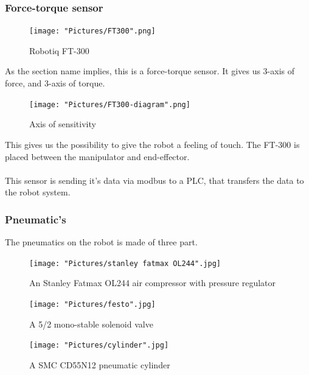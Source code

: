 \documentclass{article}
\begin{document}
  \newpage
  
        \subsubsection{Force-torque sensor}
        \begin{figure}[!h]
            \centering
            \texttt{[image: "Pictures/FT300".png]}
            \caption{Robotiq FT-300}
        \end{figure}
        
        As the section name implies, this is a force-torque sensor. It gives us 3-axis of force, and 3-axis of torque. 
        
          \begin{figure}[!h]
            \centering
            \texttt{[image: "Pictures/FT300-diagram".png]}
            \caption{Axis of sensitivity}
        \end{figure}
        This gives us the possibility to give the robot a feeling of touch. The FT-300 is placed between the manipulator and end-effector.
        \\\\
        This sensor is sending it's data via modbus to a PLC, that transfers the data to the robot system.
       
\newpage
        
        \subsubsection{Pneumatic's}
        The pneumatics on the robot is made of three part. 
        \begin{figure}[!h]
            \centering
            \texttt{[image: "Pictures/stanley fatmax OL244".jpg]}
            \caption{An Stanley Fatmax OL244 air compressor with pressure regulator}
        \end{figure}
        
        \begin{figure}[!h]
            \centering
            \texttt{[image: "Pictures/festo".jpg]}
            \caption{A 5/2 mono-stable solenoid valve}
        \end{figure}
        
        \begin{figure}[!h]
            \centering
            \texttt{[image: "Pictures/cylinder".jpg]}
            \caption{A SMC CD55N12 pneumatic cylinder}
        \end{figure}
        
\end{document}
